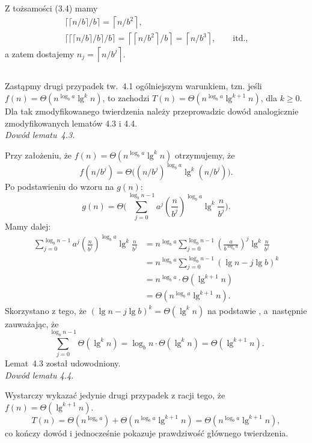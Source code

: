 \subsection{} %
Z tożsamości (3.4) mamy
\begin{gather*}
	\lceil\lceil n/b\rceil/b\rceil = \left\lceil n/b^2\right\rceil, \\
	\lceil\lceil\lceil n/b\rceil/b\rceil/b\rceil = \left\lceil\left\lceil n/b^2\right\rceil\!/b\right\rceil = \left\lceil n/b^3\right\rceil,\qquad\text{itd.,}
\end{gather*}
a zatem dostajemy $n_j=\left\lceil n/b^j\right\rceil$.

\subsection{} %
Zastąpmy drugi przypadek tw.~4.1 ogólniejszym warunkiem, tzn. jeśli $f(n)=\Theta(n^{\log_ba}\lg^kn)$, to zachodzi $T(n)=\Theta(n^{\log_ba}\lg^{k+1}n)$, dla $k\ge0$. Dla tak zmodyfikowanego twierdzenia należy przeprowadzic dowód analogicznie zmodyfikowanych lematów 4.3 i 4.4.\\

\noindent\emph{Dowód lematu~4.3.}

\noindent Przy założeniu, że $f(n)=\Theta(n^{\log_ba}\lg^kn)$ otrzymujemy, że
\[
	f(n/b^j)=\Theta\bigl((n/b^j)^{\log_ba}\lg^k(n/b^j)\bigr).
\]
Po podstawieniu do wzoru na $g(n)$:
\[
	g(n) = \Theta\biggl(\sum_{j=0}^{\log_bn-1}a^j\left(\frac{n}{b^j}\right)^{\log_ba}\lg^k\frac{n}{b^j}\biggr).
\]
Mamy dalej:
\begin{align*}
	\sum_{j=0}^{\log_bn-1}a^j\left(\frac{n}{b^j}\right)^{\log_ba}\lg^k\frac{n}{b^j} &= n^{\log_ba}\sum_{j=0}^{\log_bn-1}\left(\frac{a}{b^{\log_ba}}\right)^j\lg^k\frac{n}{b^j} \\
	&= n^{\log_ba}\sum_{j=0}^{\log_bn-1}(\lg n-j\lg b)^k \\
	&= n^{\log_ba}\cdot\Theta(\lg^{k+1}n) \\
	&= \Theta(n^{\log_ba}\lg^{k+1}n).
\end{align*}
Skorzystano z tego, że $(\lg n-j\lg b)^k=\Theta(\lg^kn)$ na podstawie , a~następnie zauważając, że
\[
	\sum_{j=0}^{\log_bn-1}\Theta(\lg^kn) = \log_bn\cdot\Theta(\lg^kn) = \Theta(\lg^{k+1}n).
\]
Lemat~4.3 został udowodniony.\\

\noindent\emph{Dowód lematu 4.4.}

\noindent Wystarczy wykazać jedynie drugi przypadek z racji tego, że $f(n)=\Theta(\lg^{k+1}n)$.
\[
	T(n) = \Theta(n^{\log_ba})+\Theta(n^{\log_ba}\lg^{k+1}n) = \Theta(n^{\log_ba}\lg^{k+1}n),
\]
co kończy dowód i jednocześnie pokazuje prawdziwość głównego twierdzenia.

